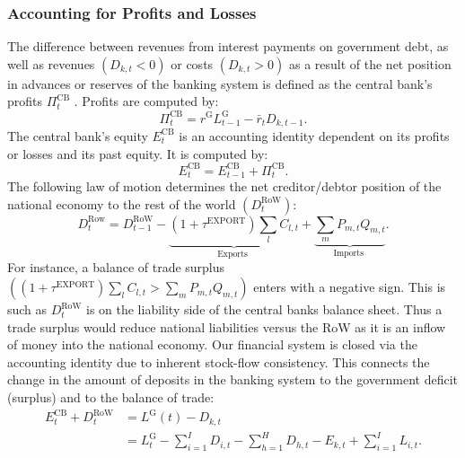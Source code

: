 \subsubsection{Accounting for Profits and Losses}
The difference between revenues from interest payments on government debt, as well as revenues $\left(D_{k,t}<0\right)$ or costs $\left(D_{k,t}>0\right)$ as a result of the net position in advances or reserves of the banking system is defined as the central bank's profits $\Pi^{\mathrm{CB}}_t$ . Profits are computed by:
\begin{equation}
    \Pi^{\mathrm{CB}}_t=r^{\mathrm{G}} L^{\mathrm{G}}_{t-1}-\bar{r}_t D_{k,t-1} .
\end{equation}
The central bank's equity $E^{\mathrm{CB}}_t$ is an accounting identity dependent on its profits or losses and its past equity. It is computed by:
\begin{equation}
    E^{\mathrm{CB}}_t=E^{\mathrm{CB}}_{t-1}+\Pi^{\mathrm{CB}}_t .
\end{equation}
The following law of motion determines the net creditor/debtor position of the national economy to the rest of the world $\left(D^{\mathrm{RoW}}_t\right)$:
\begin{equation}
    D^{\mathrm{Row}}_t=D^{\mathrm{RoW}}_{t-1}-\underbrace{\left(1+\tau^{\mathrm{EXPORT}}\right) \sum_l C_{l,t}}_{\text {Exports }}+\underbrace{\sum_m P_{m,t} Q_{m,t}}_{\text {Imports }} .
\end{equation}
For instance, a balance of trade surplus $\left(\left(1+\tau^{\mathrm{EXPORT}}\right) \sum_l C_{l,t}>\sum_m P_{m,t} Q_{m,t}\right)$ enters with a negative  sign. This is such as $D^{\mathrm{RoW}}_t$ is on the liability side of the central banks balance sheet. Thus a trade surplus  would reduce national liabilities versus the RoW as it is an inflow of money into  the national economy.  Our financial system is closed via the accounting identity due to inherent stock-flow consistency. This connects the change in the amount of deposits in the banking system to the government deficit (surplus)  and to the balance of trade: 
\begin{equation}
    \begin{aligned}
E^{\mathrm{CB}}_t+D^{\mathrm{RoW}}_t & =L^{\mathrm{G}}(t)-D_{k,t} \\
& =L^{\mathrm{G}}_t-\sum_{i=1}^I D_{i,t}-\sum_{h=1}^H D_{h,t}-E_{k,t}+\sum_{i=1}^I L_{i,t} .
\label{eq:cbequity}
\end{aligned}
\end{equation}
